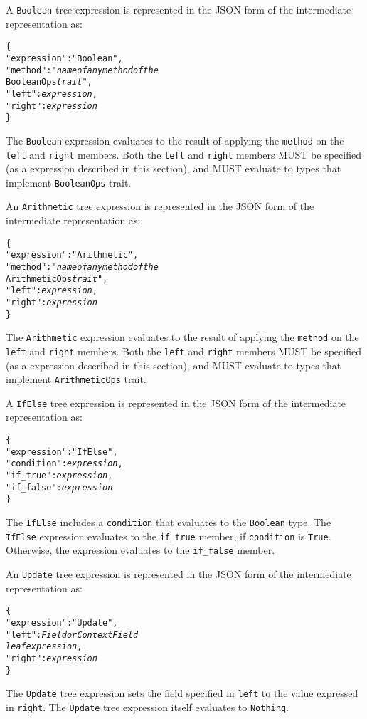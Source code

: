 \documentclass[10pt,twocolumn,a4paper]{article}
\newcommand{\code}[1]{\texttt{#1}}
\begin{document}
A \code{Boolean} tree expression is represented in the JSON form of the
intermediate representation as:
\footnotesize
\begin{alltt}
  \{
    "expression"   : "Boolean",
    "method"       : "\emph{name of any method of the}
                     BooleanOps \emph{trait}",
    "left"         : \emph{expression},
    "right"        : \emph{expression}
  \}
\end{alltt}
\normalsize
The \code{Boolean} expression evaluates to the result of applying the \code{method} on
the \code{left} and \code{right} members.
Both the \code{left} and \code{right} members MUST be specified (as a expression described
in this section), and MUST evaluate to types that implement \code{BooleanOps} trait.

An \code{Arithmetic} tree expression is represented in the JSON form of the
intermediate representation as:
\footnotesize
\begin{alltt}
  \{
    "expression"   : "Arithmetic",
    "method"       : "\emph{name of any method of the}
                     ArithmeticOps \emph{trait}",
    "left"         : \emph{expression},
    "right"        : \emph{expression}
  \}
\end{alltt}
\normalsize
The \code{Arithmetic} expression evaluates to the result of applying the \code{method} on
the \code{left} and \code{right} members.
Both the \code{left} and \code{right} members MUST be specified (as a expression described
in this section), and MUST evaluate to types that implement \code{ArithmeticOps} trait.

A \code{IfElse} tree expression is represented in the JSON form of the
intermediate representation as:
\footnotesize
\begin{alltt}
  \{
    "expression"  : "IfElse",
    "condition"   : \emph{expression},
    "if\_true"     : \emph{expression},
    "if\_false"    : \emph{expression}
  \}
\end{alltt}
\normalsize
The \code{IfElse} includes a \code{condition} that evaluates to the \code{Boolean} type.
The \code{IfElse} expression evaluates to the \code{if\_true} member, if \code{condition}
is \code{True}. Otherwise, the expression evaluates to the \code{if\_false} member.

An \code{Update} tree expression is represented in the JSON form of the
intermediate representation as:
\footnotesize
\begin{alltt}
  \{
    "expression"  : "Update",
    "left"        : \emph{Field or ContextField 
                    leaf expression},
    "right"       : \emph{expression}
  \}
\end{alltt}
\normalsize
The \code{Update} tree expression sets the field specified in \code{left} to the value
expressed in \code{right}. The \code{Update} tree expression itself evaluates to
\code{Nothing}.
\end{document}
